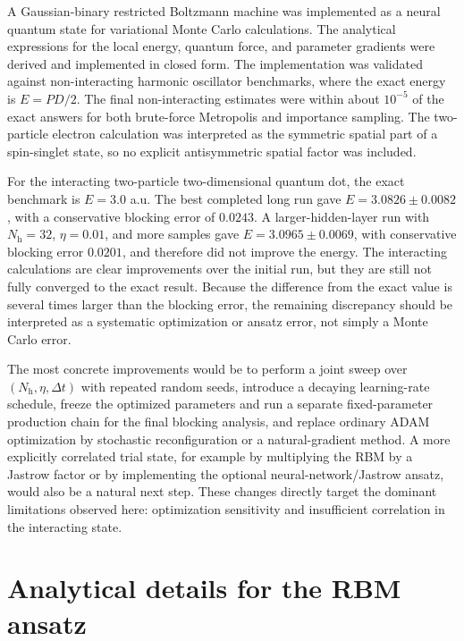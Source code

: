 \documentclass[10pt,a4paper]{article}
\newcommand{\Nh}{N_{\mathrm{h}}}
\begin{document}
A Gaussian-binary restricted Boltzmann machine was implemented as a neural quantum state for variational Monte Carlo calculations. The analytical expressions for the local energy, quantum force, and parameter gradients were derived and implemented in closed form. The implementation was validated against non-interacting harmonic oscillator benchmarks, where the exact energy is $E=PD/2$. The final non-interacting estimates were within about $10^{-5}$ of the exact answers for both brute-force Metropolis and importance sampling. The two-particle electron calculation was interpreted as the symmetric spatial part of a spin-singlet state, so no explicit antisymmetric spatial factor was included.

For the interacting two-particle two-dimensional quantum dot, the exact benchmark is $E=3.0$ a.u. The best completed long run gave $E=3.0826\pm0.0082$, with a conservative blocking error of $0.0243$. A larger-hidden-layer run with $\Nh=32$, $\eta=0.01$, and more samples gave $E=3.0965\pm0.0069$, with conservative blocking error $0.0201$, and therefore did not improve the energy. The interacting calculations are clear improvements over the initial run, but they are still not fully converged to the exact result. Because the difference from the exact value is several times larger than the blocking error, the remaining discrepancy should be interpreted as a systematic optimization or ansatz error, not simply a Monte Carlo error.

The most concrete improvements would be to perform a joint sweep over $(\Nh,\eta,\Delta t)$ with repeated random seeds, introduce a decaying learning-rate schedule, freeze the optimized parameters and run a separate fixed-parameter production chain for the final blocking analysis, and replace ordinary ADAM optimization by stochastic reconfiguration or a natural-gradient method. A more explicitly correlated trial state, for example by multiplying the RBM by a Jastrow factor or by implementing the optional neural-network/Jastrow ansatz, would also be a natural next step. These changes directly target the dominant limitations observed here: optimization sensitivity and insufficient correlation in the interacting state.

\appendix

\section{Analytical details for the RBM ansatz}\label{app:derivations}
\end{document}
